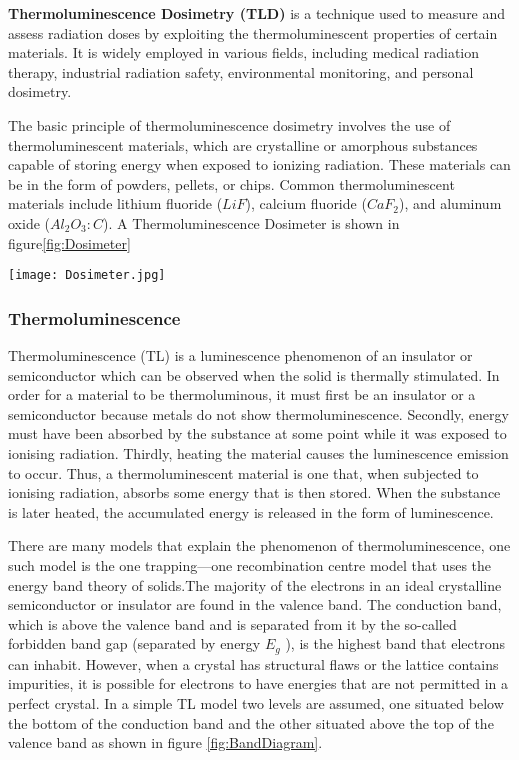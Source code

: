 \documentclass[../introduction.tex]{subfiles}
\begin{document}
    \textbf{Thermoluminescence Dosimetry (TLD)} is a technique used to measure and assess radiation doses by exploiting 
    the thermoluminescent properties of certain materials. It is widely employed in various fields, including medical 
    radiation therapy, industrial radiation safety, environmental monitoring, and personal dosimetry.

    The basic principle of thermoluminescence dosimetry involves the use of thermoluminescent materials, which are 
    crystalline or amorphous substances capable of storing energy when exposed to ionizing radiation. These materials 
    can be in the form of powders, pellets, or chips. Common thermoluminescent materials include lithium fluoride ($LiF$), 
    calcium fluoride ($CaF_2$), and aluminum oxide ($Al_2O_3:C$). A Thermoluminescence Dosimeter is shown in figure\ref{fig:Dosimeter}

    \begin{Figure}
        \centering
        \texttt{[image: Dosimeter.jpg]}
        \label{fig:Dosimeter}
    \end{Figure}

    \subsubsection*{\large Thermoluminescence}
        Thermoluminescence (TL) is a luminescence phenomenon\cite{a6} of an insulator or semiconductor which can be observed when
        the solid is thermally stimulated. In order for a material to be thermoluminous, it must first be an insulator 
        or a semiconductor because metals do not show thermoluminescence. Secondly, energy must have been absorbed by 
        the substance at some point while it was exposed to ionising radiation. Thirdly, heating the material causes the 
        luminescence emission to occur. Thus, a thermoluminescent material is one that, when subjected to ionising 
        radiation, absorbs some energy that is then stored. When the substance is later heated, the accumulated energy is 
        released in the form of luminescence.\cite{b1}
        
        There are many models that explain the phenomenon of thermoluminescence\cite{b5}, one such model is the one 
        trapping—one recombination centre model\cite{b2} that uses the energy band theory of solids.The majority of the 
        electrons in an ideal crystalline semiconductor or insulator are found in the valence band. The conduction band, 
        which is above the valence band and is separated from it by the so-called forbidden band gap (separated by energy $E_g$ ), 
        is the highest band that electrons can inhabit. However, when a crystal has structural flaws or the lattice 
        contains impurities, it is possible for electrons to have energies that are not permitted in a perfect crystal.
        In a simple TL model two levels are assumed, one situated below the bottom of the conduction band and the other 
        situated above the top of the valence band as shown in figure \ref{fig:BandDiagram}. 
\end{document}
